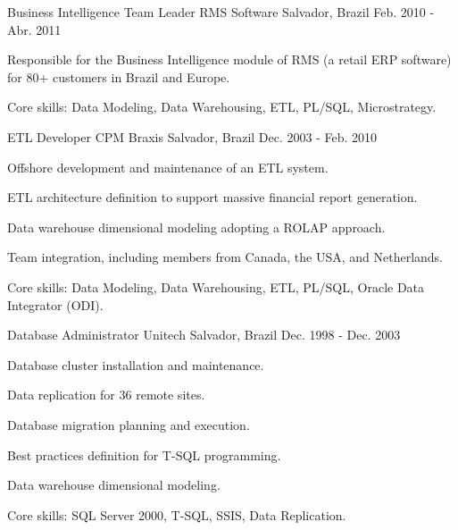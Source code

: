 \begin{cventries}

\cventry
{Business Intelligence Team Leader} %
{RMS Software} %
{Salvador, Brazil} %
{Feb. 2010 - Abr. 2011} %
{ %
\begin{cvitems}
	\item{Responsible for the Business Intelligence module of RMS (a retail ERP software) for 80+ customers in Brazil and Europe.}
	\item{Core skills: Data Modeling, Data Warehousing, ETL, PL/SQL, Microstrategy.}
\end{cvitems}
}


\cventry
{ETL Developer} %
{CPM Braxis} %
{Salvador, Brazil} %
{Dec. 2003 - Feb. 2010} %
{ %
\begin{cvitems}
\item{Offshore development and maintenance of an ETL system.} 
\item{ETL architecture definition to support massive financial report generation.} 
\item{Data warehouse dimensional modeling adopting a ROLAP approach.}
\item{Team integration, including members from Canada, the USA, and Netherlands.}
\item{Core skills: Data Modeling, Data Warehousing, ETL, PL/SQL, Oracle Data Integrator (ODI).}
\end{cvitems}
}


\cventry
{Database Administrator} %
{Unitech} %
{Salvador, Brazil} %
{Dec. 1998 - Dec. 2003} %
{ %
\begin{cvitems}
	\item{Database cluster installation and maintenance.}
	\item{Data replication for 36 remote sites.} 
	\item{Database migration planning and execution.}
	\item{Best practices definition for T-SQL programming.}
	\item{Data warehouse dimensional modeling.}
	\item{Core skills: SQL Server 2000, T-SQL, SSIS, Data Replication.}
\end{cvitems}
}


\end{cventries}